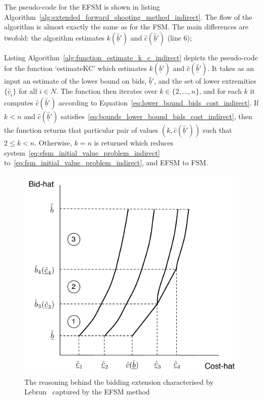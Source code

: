The pseudo-code for the EFSM is shown in listing Algorithm~\ref{alg:extended_forward_shooting_method_indirect}. The flow of the algorithm is almost exactly the same as for the FSM. The main differences are twofold: the algorithm estimates $k(\underline{\hat{b}}')$ and $\hat{c}(\underline{\hat{b}}')$ (line 6); 

Listing Algorithm~\ref{alg:function_estimate_k_c_indirect} depicts the pseudo-code for the function `estimateKC' which estimates $k(\underline{\hat{b}}')$ and $\hat{c}(\underline{\hat{b}}')$. It takes as an input an estimate of the lower bound on bids, $\underline{\hat{b}}'$, and the set of lower extremities $\{\underline{\hat{c}}_i\}$ for all $i\in N$. The function then iterates over $k\in\{2,\ldots,n\}$, and for each $k$ it computes $\hat{c}(\underline{\hat{b}}')$ according to Equation~\eqref{eq:lower_bound_bids_cost_indirect}. If $k<n$ and $\hat{c}(\underline{\hat{b}}')$ satisfies~\eqref{eq:bounds_lower_bound_bids_cost_indirect}, then the function returns that particular pair of values $(k, \hat{c}(\underline{\hat{b}}'))$ such that $2\leq k < n$. Otherwise, $k=n$ is returned which reduces system~\eqref{eq:efsm_initial_value_problem_indirect} to~\eqref{eq:fsm_initial_value_problem_indirect}, and EFSM to FSM.

\begin{figure}[t]
  \includegraphics[width=\figsize]{Indirect/Figures/lebrun_solution}
  \caption{The reasoning behind the bidding extension characterised by Lebrun~\cite{Lebrun2006} captured by the EFSM method}
  \label{fig:lebrun_solution_indirect}
\end{figure}

